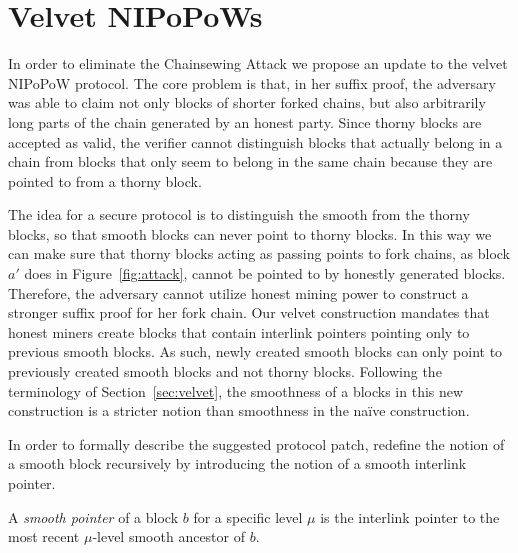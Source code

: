 \section{Velvet NIPoPoWs}\label{sec:construction}
In order to eliminate the Chainsewing Attack we propose an update to the velvet NIPoPoW protocol. The core problem is that, in her suffix proof, the adversary was able to claim not only blocks of shorter forked chains, but also arbitrarily long parts of the chain generated by an honest party. Since thorny blocks are accepted as valid, the verifier cannot distinguish blocks that actually belong in a chain from blocks that only seem to belong in the same chain because they are pointed to from a thorny block.

The idea for a secure protocol is to distinguish the smooth from the thorny blocks, so that smooth blocks can never point to thorny blocks. In this way we can make sure that thorny blocks acting as passing points to fork chains, as block $a'$ does in Figure~\ref{fig:attack}, cannot be pointed to by honestly generated blocks. Therefore, the adversary cannot utilize honest mining power to construct a stronger suffix proof for her fork chain. Our velvet construction mandates that honest miners create blocks that contain interlink pointers pointing only to previous smooth blocks. As such, newly created smooth blocks can only point to previously created smooth blocks and not thorny blocks. Following the terminology of Section~\ref{sec:velvet}, the smoothness of a blocks in this new construction is a stricter notion than smoothness in the na\"ive construction.

In order to formally describe the suggested protocol patch, redefine the notion of a smooth block recursively by introducing the notion of a smooth interlink pointer.

\begin{definition}
  A \emph{smooth pointer} of a block $b$ for a specific level $\mu$ is the interlink pointer to the most recent $\mu$-level smooth ancestor of $b$.
	\label{defn:smooth_pointer}
\end{definition}

